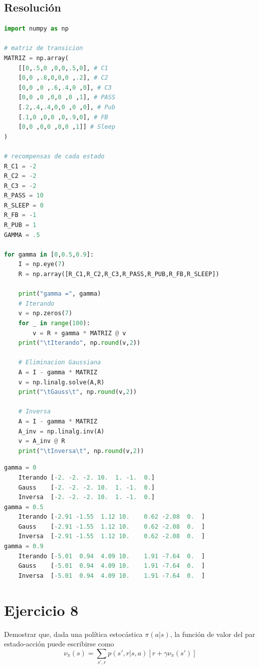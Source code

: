 \documentclass[12pt,a4paper]{article}
\begin{document}
\subsection{Resolución}

\begin{lstlisting}[language=Python]
import numpy as np

# matriz de transicion
MATRIZ = np.array(    
    [[0,.5,0 ,0,0,.5,0], # C1
    [0,0 ,.8,0,0,0 ,.2], # C2
    [0,0 ,0 ,.6,.4,0 ,0], # C3
    [0,0 ,0 ,0,0 ,0 ,1], # PASS
    [.2,.4,.4,0,0 ,0 ,0], # Pub
    [.1,0 ,0,0 ,0,.9,0], # FB
    [0,0 ,0,0 ,0,0 ,1]] # Sleep
)

# recompensas de cada estado
R_C1 = -2
R_C2 = -2
R_C3 = -2
R_PASS = 10
R_SLEEP = 0
R_FB = -1
R_PUB = 1
GAMMA = .5

for gamma in [0,0.5,0.9]:
    I = np.eye(7)
    R = np.array([R_C1,R_C2,R_C3,R_PASS,R_PUB,R_FB,R_SLEEP])
    
    print("gamma =", gamma)
    # Iterando
    v = np.zeros(7)
    for _ in range(100):
        v = R + gamma * MATRIZ @ v
    print("\tIterando", np.round(v,2))
    
    # Eliminacion Gaussiana
    A = I - gamma * MATRIZ
    v = np.linalg.solve(A,R)
    print("\tGauss\t", np.round(v,2))
    
    # Inversa
    A = I - gamma * MATRIZ
    A_inv = np.linalg.inv(A)
    v = A_inv @ R
    print("\tInversa\t", np.round(v,2))
\end{lstlisting}

\begin{lstlisting}[language=Python]
gamma = 0
	Iterando [-2. -2. -2. 10.  1. -1.  0.]
	Gauss  	 [-2. -2. -2. 10.  1. -1.  0.]
	Inversa	 [-2. -2. -2. 10.  1. -1.  0.]
gamma = 0.5
	Iterando [-2.91 -1.55  1.12 10.    0.62 -2.08  0.  ]
	Gauss  	 [-2.91 -1.55  1.12 10.    0.62 -2.08  0.  ]
	Inversa	 [-2.91 -1.55  1.12 10.    0.62 -2.08  0.  ]
gamma = 0.9
	Iterando [-5.01  0.94  4.09 10.    1.91 -7.64  0.  ]
	Gauss  	 [-5.01  0.94  4.09 10.    1.91 -7.64  0.  ]
	Inversa	 [-5.01  0.94  4.09 10.    1.91 -7.64  0.  ]
\end{lstlisting}

\section{Ejercicio 8}

Demostrar que, dada una política estocástica $\pi(a|s)$, la función de valor del par
estado-acción puede escribirse como
$$ \nu_\pi(s) = \sum_{s',r} p(s',r|s,a)[r + \gamma \nu_\pi(s')] $$
\end{document}
